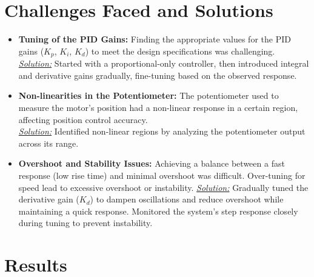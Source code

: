 \documentclass{article}
\begin{document}
\section{Challenges Faced and Solutions}
\begin{itemize}%
    \item \textbf{Tuning of the PID Gains:} Finding the appropriate values for the PID gains ($K_p$, $K_i$, $K_d$) to meet the design specifications was challenging.\\
    \underline{\textit{Solution:}} Started with a proportional-only controller, then introduced integral and derivative gains gradually, fine-tuning based on the observed response.

    \item \textbf{Non-linearities in the Potentiometer:} The potentiometer used to measure the motor's position had a non-linear response in a certain region, affecting position control accuracy.\\
    \underline{\textit{Solution:}} Identified non-linear regions by analyzing the potentiometer output across its range. 

    \item \textbf{Overshoot and Stability Issues:} Achieving a balance between a fast response (low rise time) and minimal overshoot was difficult. Over-tuning for speed lead to excessive overshoot or instability.
    \underline{\textit{Solution:}} Gradually tuned the derivative gain ($K_d$) to dampen oscillations and reduce overshoot while maintaining a quick response. Monitored the system's step response closely during tuning to prevent instability.
\end{itemize}

\section{Results}
\end{document}
